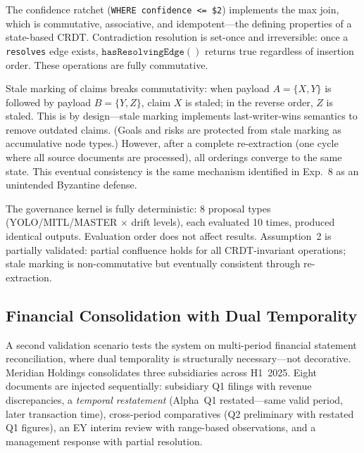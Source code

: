 \documentclass[11pt]{article}
\begin{document}
The confidence ratchet (\texttt{WHERE confidence <= \$2}) implements the max join, which is commutative, associative, and idempotent---the defining properties of a state-based CRDT. Contradiction resolution is set-once and irreversible: once a \texttt{resolves} edge exists, $\texttt{hasResolvingEdge}()$ returns true regardless of insertion order. These operations are fully commutative.

Stale marking of claims breaks commutativity: when payload $A = \{X, Y\}$ is followed by payload $B = \{Y, Z\}$, claim $X$ is staled; in the reverse order, $Z$ is staled. This is by design---stale marking implements last-writer-wins semantics to remove outdated claims. (Goals and risks are protected from stale marking as accumulative node types.) However, after a complete re-extraction (one cycle where all source documents are processed), all orderings converge to the same state. This eventual consistency is the same mechanism identified in Exp.~8 as an unintended Byzantine defense.

The governance kernel is fully deterministic: 8 proposal types (YOLO/MITL/MASTER $\times$ drift levels), each evaluated 10 times, produced identical outputs. Evaluation order does not affect results. Assumption~2 is partially validated: partial confluence holds for all CRDT-invariant operations; stale marking is non-commutative but eventually consistent through re-extraction.

\subsection{Financial Consolidation with Dual Temporality}

A second validation scenario tests the system on multi-period financial statement reconciliation, where dual temporality is structurally necessary---not decorative. Meridian Holdings consolidates three subsidiaries across H1~2025. Eight documents are injected sequentially: subsidiary Q1 filings with revenue discrepancies, a \emph{temporal restatement} (Alpha~Q1 restated---same valid period, later transaction time), cross-period comparatives (Q2 preliminary with restated Q1 figures), an EY interim review with range-based observations, and a management response with partial resolution.
\end{document}
